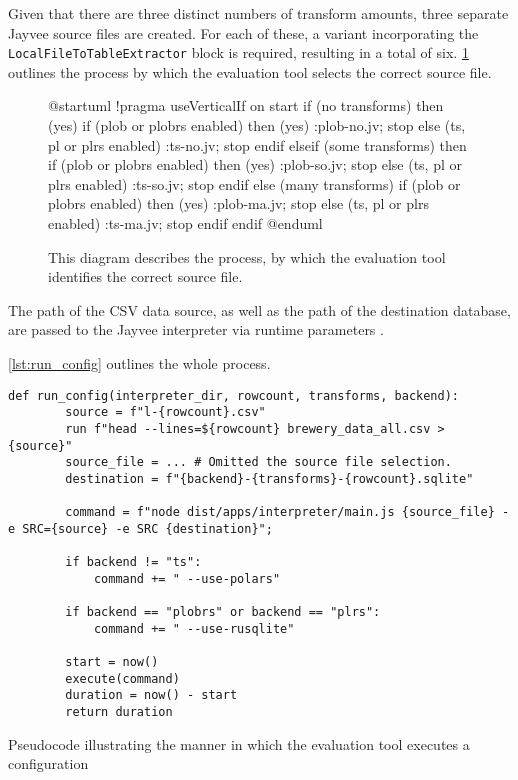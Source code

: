 Given that there are three distinct numbers of transform amounts, three separate Jayvee source files are created.
For each of these, a variant incorporating the \Verb|LocalFileToTableExtractor| block is required, resulting in a total of six.
\ref{fig:uml:pick-jv-model} outlines the process by which the evaluation tool selects the correct source file.
\begin{figure}
	\begin{plantuml}
		@startuml
		!pragma useVerticalIf on
		start
		if (no transforms) then (yes)
		if (plob or plobrs enabled) then (yes)
		:plob-no.jv;
		stop
		else (ts, pl or plrs enabled)
		:ts-no.jv;
		stop
		endif
		elseif (some transforms) then
		if (plob or plobrs enabled) then (yes)
		:plob-so.jv;
		stop
		else (ts, pl or plrs enabled)
		:ts-so.jv;
		stop
		endif
		else (many transforms)
		if (plob or plobrs enabled) then (yes)
		:plob-ma.jv;
		stop
		else (ts, pl or plrs enabled)
		:ts-ma.jv;
		stop
		endif
		endif
		@enduml
	\end{plantuml}
	\caption{This diagram describes the process, by which the evaluation tool identifies the correct source file.}
	\label{fig:uml:pick-jv-model}
\end{figure}

The path of the \ac{CSV} data source, as well as the path of the destination database, are passed to the Jayvee interpreter via runtime parameters \autocite{jvalue:jayvee:docs:runtime}.

\ref{lst:run_config} outlines the whole process.

\begin{listing}
	\begin{verbatim}
def run_config(interpreter_dir, rowcount, transforms, backend):
		source = f"l-{rowcount}.csv"
		run f"head --lines=${rowcount} brewery_data_all.csv > {source}"
		source_file = ... # Omitted the source file selection.
		destination = f"{backend}-{transforms}-{rowcount}.sqlite"

		command = f"node dist/apps/interpreter/main.js {source_file} -e SRC={source} -e SRC {destination}";

		if backend != "ts":
			command += " --use-polars"

		if backend == "plobrs" or backend == "plrs":
			command += " --use-rusqlite"

		start = now()
		execute(command)
		duration = now() - start
		return duration
	\end{verbatim}
	\caption{Pseudocode illustrating the manner in which the evaluation tool executes a configuration} %
	\label{lst:run_config}
\end{listing}

